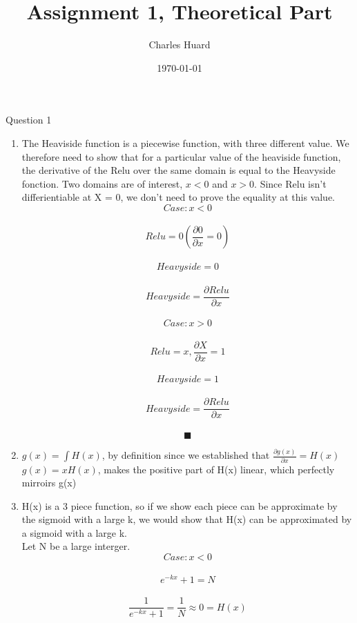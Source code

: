 \documentclass{article}
\title{Assignment 1, Theoretical Part}
\author{Charles Huard}
\date{\today}
\begin{document}
\maketitle

\vspace{0.5cm}


 Question 1 \\
  \begin{enumerate}

    \item
	The Heaviside function is a piecewise function, with three different value. We therefore need to show that for a particular value of the heaviside function, the derivative of the Relu over    	the same domain is equal to the Heavyside fonction. Two domains are of interest, $x < 0$ and $x > 0$. Since Relu isn't differientiable at X = 0, we don't need to prove the equality at this 		          value.\\

	$$Case: x < 0$$\\
	$$Relu = 0 (\frac{\partial 0}{\partial x} = 0)$$ \\
	$$Heavyside = 0$$ \\
	$$Heavyside = \frac{\partial Relu}{\partial x}$$\\	
	$$Case: x > 0$$\\
	$$Relu = x, \frac{\partial X}{\partial x} = 1 $$ \\
	$$Heavyside = 1$$ \\
	$$Heavyside = \frac{\partial Relu}{\partial x}$$\\
	 $$\blacksquare$$

	\item
		$ g(x) = \int H(x)$, by definition since we established that $\frac{\partial g(x)}{\partial x} = H(x)$\\

		
		$ g(x) = xH(x)$, makes the positive part of H(x) linear, which perfectly mirroirs g(x)

	\item 
		H(x) is a 3 piece function, so if we show each piece can be approximate by the sigmoid with a large k, we would show that H(x) can be approximated by a sigmoid with a large k.\\

		Let N be a large interger.\\

		
		$$Case:x < 0$$\\
		$$e^{-kx} + 1 = N$$\\
		$$\frac{1}{e^{-kx} + 1} = \frac{1}{N} \approx 0 = H(x)$$\\ \\


\end{enumerate}
\end{document}
